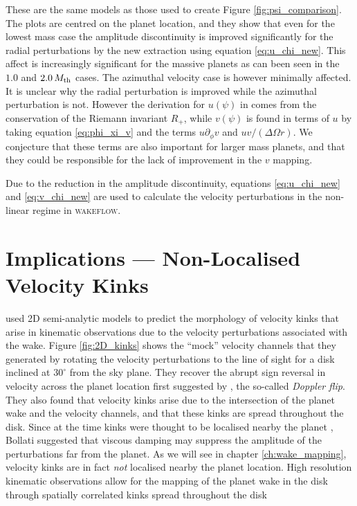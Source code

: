 These are the same models as those used to create Figure \ref{fig:psi_comparison}. 
The plots are centred on the planet location, and they show that even for the lowest mass case the amplitude discontinuity is improved significantly for the radial perturbations by the new extraction using equation \ref{eq:u_chi_new}. 
This affect is increasingly significant for the massive planets as can been seen in the $1.0$ and $2.0 \, M_{\rm th}$ cases. The azimuthal velocity case is however minimally affected. 
It is unclear why the radial perturbation is improved while the azimuthal perturbation is not.
However the derivation for $u(\psi)$ in \citet{rafikov2002a} comes from the conservation of the Riemann invariant $R_+$, while $v(\psi)$ is found in terms of $u$ by taking equation \ref{eq:phi_xi_v} and the terms $u \partial_\phi v$ and $u v / (\Delta \Omega r)$.
We conjecture that these terms are also important for larger mass planets, and that they could be responsible for the lack of improvement in the $v$ mapping.

Due to the reduction in the amplitude discontinuity, equations \ref{eq:u_chi_new} and \ref{eq:v_chi_new} are used to calculate the velocity perturbations in the non-linear regime in \textsc{wakeflow}. 

\section{Implications --- Non-Localised Velocity Kinks}

\citet{bollati2021} used 2D semi-analytic models to predict the morphology of velocity kinks that arise in kinematic observations \citep{pinte2018a} due to the velocity perturbations associated with the wake.
Figure \ref{fig:2D_kinks} shows the ``mock'' velocity channels that they generated by rotating the velocity perturbations to the line of sight for a disk inclined at $30^\circ$ from the sky plane.
They recover the abrupt sign reversal in velocity across the planet location first suggested by \citet{casassus2019}, the so-called \textit{Doppler flip}.
They also found that velocity kinks arise due to the intersection of the planet wake and the velocity channels, and that these kinks are spread throughout the disk.
Since at the time kinks were thought to be localised nearby the planet \citep{pinte2018a,pinte2019,pinte2020}, Bollati suggested that viscous damping may suppress the amplitude of the perturbations far from the planet.
As we will see in chapter \ref{ch:wake_mapping}, velocity kinks are in fact \textit{not} localised nearby the planet location.
High resolution kinematic observations allow for the mapping of the planet wake in the disk through spatially correlated kinks spread throughout the disk \citep{calcino2022,teague2022,verrios2022}


